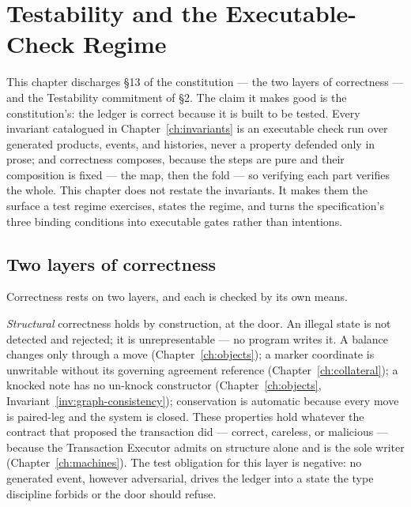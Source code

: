 \section{Testability and the Executable-Check Regime}\label{ch:testability}

This chapter discharges \S 13 of the constitution --- the two layers of correctness ---
and the Testability commitment of \S 2. The claim it makes good is the constitution's: the
ledger is correct because it is built to be tested. Every invariant catalogued in
Chapter~\ref{ch:invariants} is an executable check run over generated products, events, and
histories, never a property defended only in prose; and correctness composes, because the
steps are pure and their composition is fixed --- the map, then the fold --- so verifying
each part verifies the whole. This chapter does not restate the invariants. It makes them
the surface a test regime exercises, states the regime, and turns the specification's three
binding conditions into executable gates rather than intentions.

\subsection{Two layers of correctness}

Correctness rests on two layers, and each is checked by its own means.

\emph{Structural} correctness holds by construction, at the door. An illegal state is not
detected and rejected; it is unrepresentable --- no program writes it. A balance changes
only through a move (Chapter~\ref{ch:objects}); a marker coordinate is unwritable without
its governing agreement reference (Chapter~\ref{ch:collateral}); a knocked note has no
un-knock constructor (Chapter~\ref{ch:objects}, Invariant~\ref{inv:graph-consistency});
conservation is automatic because every move is paired-leg and the system is closed. These
properties hold whatever the contract that proposed the transaction did --- correct,
careless, or malicious --- because the Transaction Executor admits on structure alone and
is the sole writer (Chapter~\ref{ch:machines}). The test obligation for this layer is
negative: no generated event, however adversarial, drives the ledger into a state the type
discipline forbids or the door should refuse.

